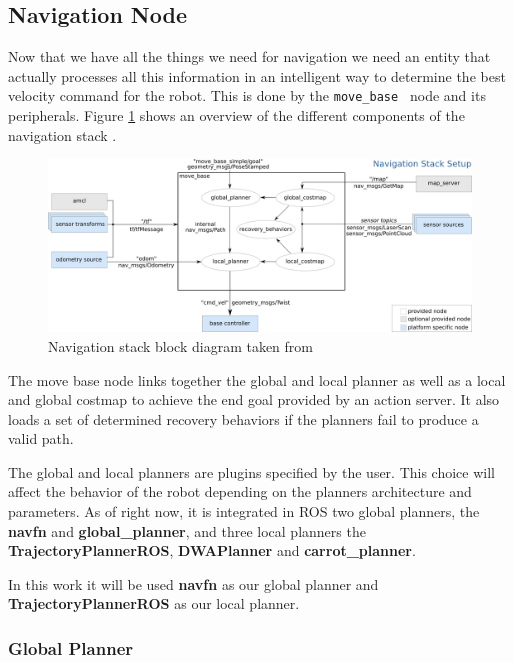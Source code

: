 \subsection{Navigation Node}
Now that we have all the things we need for navigation we need an entity that actually processes all this information in an intelligent way to determine the best velocity command for the robot. This is done by the \texttt{move\_base } node and its peripherals.
Figure \ref{fig:navstack} shows an overview of the different components of the navigation stack \cite{movebase}.
\begin{figure}[!htb]
    \centering
    \includegraphics[width=\linewidth]{imgs/chapter3/navstack.png}
    \caption[Navigation stack block diagram]{Navigation stack block diagram taken from \cite{movebase}}
    \label{fig:navstack}
\end{figure}

The move base node links together the global and local planner as well as a local and global costmap to achieve the end goal provided by an action server. It also loads a set of determined recovery behaviors if the planners fail to produce a valid path. 

The global and local planners are plugins specified by the user. This choice will affect the behavior of the robot depending on the planners architecture and parameters. As of right now, it is integrated in \ac{ROS}  two global planners, the \textbf{navfn} and \textbf{global_planner}, and three local planners the \textbf{TrajectoryPlannerROS}, \textbf{DWAPlanner} and \textbf{carrot_planner}.

In this work it will be used \textbf{navfn} as our global planner and \textbf{TrajectoryPlannerROS} as our local planner.

\subsubsection{Global Planner}
 
